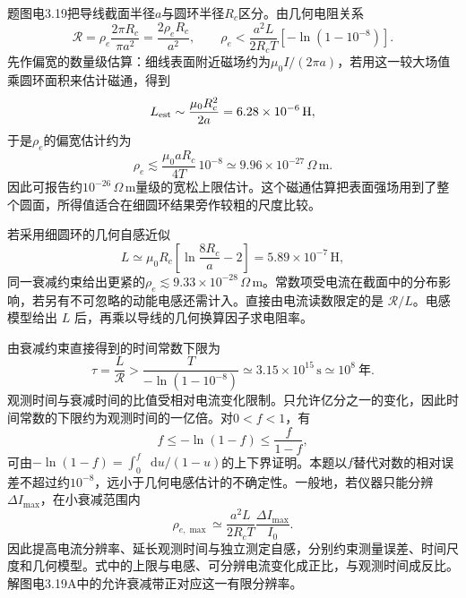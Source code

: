 \documentclass[UTF8,fontset=fandol,a4paper,11pt]{ctexart}
\newcommand{\dd}{\mathop{}\!\mathrm{d}}
\begin{document}
题图电3.19把导线截面半径$a$与圆环半径$R_c$区分。由几何电阻关系
\[
\mathcal R=\rho_e\frac{2\pi R_c}{\pi a^2}
=\frac{2\rho_eR_c}{a^2},
\qquad
\rho_e<\frac{a^2L}{2R_cT}[-\ln(1-10^{-8})].
\]
先作偏宽的数量级估算：细线表面附近磁场约为$\mu_0I/(2\pi a)$，若用这一较大场值乘圆环面积来估计磁通，得到
\[
L_{\rm est}\sim\frac{\mu_0R_c^2}{2a}=6.28\times10^{-6}\,\mathrm H,
\]
于是$\rho_e$的偏宽估计约为
\[
\rho_e\lesssim\frac{\mu_0aR_c}{4T}\,10^{-8}
\simeq9.96\times10^{-27}\,\Omega\,\mathrm m.
\]
因此可报告约$10^{-26}\,\Omega\,\mathrm m$量级的宽松上限估计。这个磁通估算把表面强场用到了整个圆面，所得值适合在细圆环结果旁作较粗的尺度比较。

若采用细圆环的几何自感近似
\[
L\simeq\mu_0R_c\left[\ln\frac{8R_c}{a}-2\right]
=5.89\times10^{-7}\,\mathrm H,
\]
同一衰减约束给出更紧的$\rho_e\lesssim9.33\times10^{-28}\,\Omega\,\mathrm m$。常数项受电流在截面中的分布影响，若另有不可忽略的动能电感还需计入。直接由电流读数限定的是 $\mathcal R/L$。电感模型给出 $L$ 后，再乘以导线的几何换算因子求电阻率。

由衰减约束直接得到的时间常数下限为
\[
\tau=\frac L{\mathcal R}>
\frac{T}{-\ln(1-10^{-8})}\simeq3.15\times10^{15}\,\mathrm s
\simeq10^8\ \text{年}.
\]
观测时间与衰减时间的比值受相对电流变化限制。只允许亿分之一的变化，因此时间常数的下限约为观测时间的一亿倍。对$0<f<1$，有
\[
f\le-\ln(1-f)\le\frac f{1-f},
\]
可由$-\ln(1-f)=\int_0^f\dd u/(1-u)$的上下界证明。本题以$f$替代对数的相对误差不超过约$10^{-8}$，远小于几何电感估计的不确定性。一般地，若仪器只能分辨$\Delta I_{\max}$，在小衰减范围内
\[
\rho_{e,\max}\simeq\frac{a^2L}{2R_cT}\frac{\Delta I_{\max}}{I_0}.
\]
因此提高电流分辨率、延长观测时间与独立测定自感，分别约束测量误差、时间尺度和几何模型。式中的上限与电感、可分辨电流变化成正比，与观测时间成反比。解图电3.19A中的允许衰减带正对应这一有限分辨率。
\end{document}
